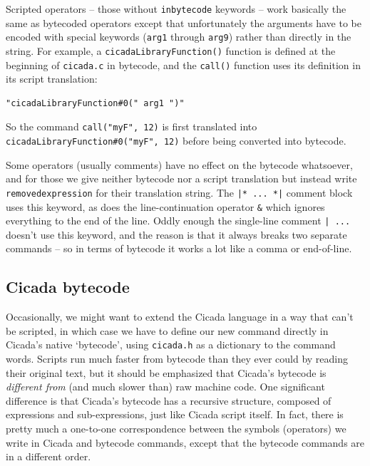 \documentclass{article}
\newenvironment{code}{
       \begin{list}{}{
               \setlength{\leftmargin}{.4in}
               \setlength{\rightmargin}{0in}
               \setlength{\topsep}{.2in}
       }
       \small
       \item[] }
       { \end{list}   }
\begin{document}
Scripted operators -- those without \verb#inbytecode# keywords -- work basically the same as bytecoded operators except that unfortunately the arguments have to be encoded with special keywords (\verb#arg1# through \verb#arg9#) rather than directly in the string.  For example, a \verb#cicadaLibraryFunction()# function is defined at the beginning of \verb#cicada.c# in bytecode, and the \verb#call()# function uses its definition in its script translation:

\begin{code} \begin{verbatim}
"cicadaLibraryFunction#0(" arg1 ")"
\end{verbatim} \end{code}

\noindent So the command \verb#call("myF", 12)# is first translated into \verb$cicadaLibraryFunction#0("myF", 12)$ before being converted into bytecode.

Some operators (usually comments) have no effect on the bytecode whatsoever, and for those we give neither bytecode nor a script translation but instead write \verb#removedexpression# for their translation string.  The \verb#|* ... *|# comment block uses this keyword, as does the line-continuation operator \verb#&# which ignores everything to the end of the line.  Oddly enough the single-line comment \verb#| ...# doesn't use this keyword, and the reason is that it always breaks two separate commands -- so in terms of bytecode it works a lot like a comma or end-of-line. 






\subsection{Cicada bytecode}

Occasionally, we might want to extend the Cicada language in a way that can't be scripted, in which case we have to define our new command directly in Cicada's native `bytecode', using \verb#cicada.h# as a dictionary to the command words.  Scripts run much faster from bytecode than they ever could by reading their original text, but it should be emphasized that Cicada's bytecode is \emph{different from} (and much slower than) raw machine code.  One significant difference is that Cicada's bytecode has a recursive structure, composed of expressions and sub-expressions, just like Cicada script itself.  In fact, there is pretty much a one-to-one correspondence between the symbols (operators) we write in Cicada and bytecode commands, except that the bytecode commands are in a different order.
\end{document}
